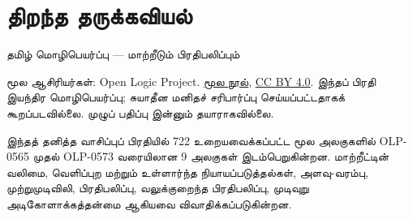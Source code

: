 \documentclass[11pt,a4paper,openany]{memoir}
\begin{document}
\let\Olref\olref
\raggedright
\pagestyle{plain}
\chapter*{திறந்த தருக்கவியல்}
\noindent தமிழ் மொழிபெயர்ப்பு — மாற்றீடும் பிரதிபலிப்பும்

\noindent மூல ஆசிரியர்கள்: Open Logic Project.
\href{https://github.com/OpenLogicProject/OpenLogic}{மூல நூல்},
\href{https://creativecommons.org/licenses/by/4.0/}{CC BY 4.0}.
இந்தப் பிரதி இயந்திர மொழிபெயர்ப்பு; சுயாதீன மனிதச் சரிபார்ப்பு செய்யப்பட்டதாகக்
கூறப்படவில்லை. முழுப் பதிப்பு இன்னும் தயாராகவில்லை.

\noindent இந்தத் தனித்த வாசிப்புப் பிரதியில் 722 உறையவைக்கப்பட்ட மூல
அலகுகளில் OLP-0565 முதல் OLP-0573 வரையிலான 9 அலகுகள் இடம்பெறுகின்றன.
மாற்றீட்டின் வலிமை, வெளிப்புற மற்றும் உள்ளார்ந்த நியாயப்படுத்தல்கள்,
அளவு-வரம்பு, முற்றுமுடிவிலி, பிரதிபலிப்பு, வலுக்குறைந்த பிரதிபலிப்பு,
முடிவுறு அடிகோளாக்கத்தன்மை ஆகியவை விவாதிக்கப்படுகின்றன.

\clearpage
\tableofcontents*



\end{document}

